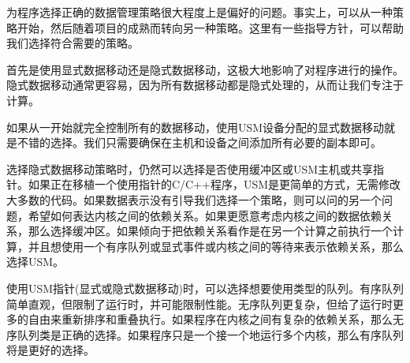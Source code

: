为程序选择正确的数据管理策略很大程度上是偏好的问题。事实上，可以从一种策略开始，然后随着项目的成熟而转向另一种策略。这里有一些指导方针，可以帮助我们选择符合需要的策略。\par

首先是使用显式数据移动还是隐式数据移动，这极大地影响了对程序进行的操作。隐式数据移动通常更容易，因为所有数据移动都是隐式处理的，从而让我们专注于计算。\par

如果从一开始就完全控制所有的数据移动，使用USM设备分配的显式数据移动就是不错的选择。我们只需要确保在主机和设备之间添加所有必要的副本即可。\par

选择隐式数据移动策略时，仍然可以选择是否使用缓冲区或USM主机或共享指针。如果正在移植一个使用指针的C/C++程序，USM是更简单的方式，无需修改大多数的代码。如果数据表示没有引导我们选择一个策略，则可以问的另一个问题，希望如何表达内核之间的依赖关系。如果更愿意考虑内核之间的数据依赖关系，那么选择缓冲区。如果倾向于把依赖关系看作是在另一个计算之前执行一个计算，并且想使用一个有序队列或显式事件或内核之间的等待来表示依赖关系，那么选择USM。\par

使用USM指针(显式或隐式数据移动)时，可以选择想要使用类型的队列。有序队列简单直观，但限制了运行时，并可能限制性能。无序队列更复杂，但给了运行时更多的自由来重新排序和重叠执行。如果程序在内核之间有复杂的依赖关系，那么无序队列类是正确的选择。如果程序只是一个接一个地运行多个内核，那么有序队列将是更好的选择。\par






















